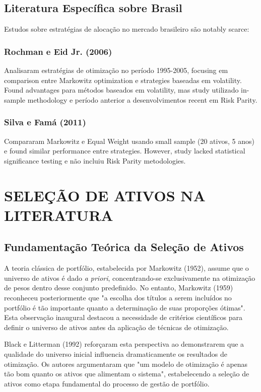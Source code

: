 \subsection{Literatura Específica sobre Brasil}

Estudos sobre estratégias de alocação no mercado brasileiro são notably scarce:

\subsubsection{Rochman e Eid Jr. (2006)}

Analisaram estratégias de otimização no período 1995-2005, focusing em comparison entre Markowitz optimization e strategies baseadas em volatility. Found advantages para métodos baseados em volatility, mas study utilizado in-sample methodology e período anterior a desenvolvimentos recent em Risk Parity.

\subsubsection{Silva e Famá (2011)}

Compararam Markowitz e Equal Weight usando small sample (20 ativos, 5 anos) e found similar performance entre strategies. However, study lacked statistical significance testing e não incluiu Risk Parity metodologies.

\section{SELEÇÃO DE ATIVOS NA LITERATURA}

\subsection{Fundamentação Teórica da Seleção de Ativos}

A teoria clássica de portfólio, estabelecida por Markowitz (1952), assume que o universo de ativos é dado \emph{a priori}, concentrando-se exclusivamente na otimização de pesos dentro desse conjunto predefinido. No entanto, Markowitz (1959) reconheceu posteriormente que "a escolha dos títulos a serem incluídos no portfólio é tão importante quanto a determinação de suas proporções ótimas". Esta observação inaugural destacou a necessidade de critérios científicos para definir o universo de ativos antes da aplicação de técnicas de otimização.

Black e Litterman (1992) reforçaram esta perspectiva ao demonstrarem que a qualidade do universo inicial influencia dramaticamente os resultados de otimização. Os autores argumentaram que "um modelo de otimização é apenas tão bom quanto os ativos que alimentam o sistema", estabelecendo a seleção de ativos como etapa fundamental do processo de gestão de portfólio.

